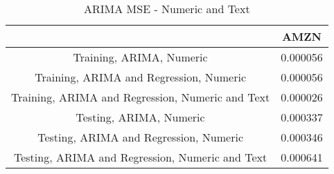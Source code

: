 \begin{table}[!h]
\caption{ARIMA MSE - Numeric and Text}
 \label{ARIMA MSE - Numeric and Text}
\captionsetup{justification=centering} 
 \begin{center}\begin{tabular}{|c|c|}\hline
{} &      AMZN \\ \hline
Training, ARIMA, Numeric                         &  0.000056 \\ \hline
Training, ARIMA and Regression, Numeric          &  0.000056 \\ \hline
Training, ARIMA and Regression, Numeric and Text &  0.000026 \\ \hline
Testing, ARIMA, Numeric                          &  0.000337 \\ \hline
Testing, ARIMA and Regression, Numeric           &  0.000346 \\ \hline
Testing, ARIMA and Regression, Numeric and Text  &  0.000641 \\ \hline
\end{tabular}
 \end{center}
\end{table}